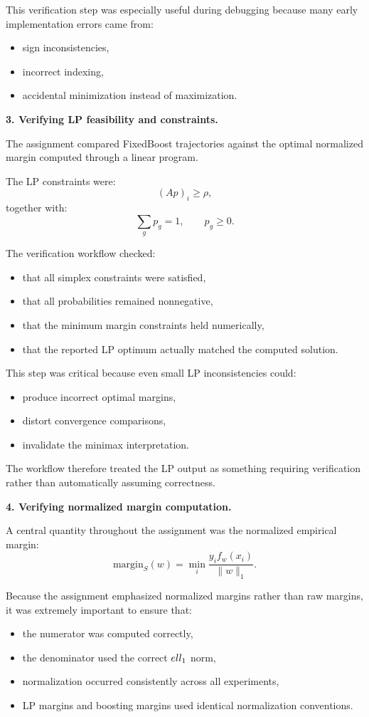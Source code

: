 \documentclass[11pt]{article}
\begin{document}
\begin{enumerate}
\begin{solutionbox}
This verification step was especially useful during debugging because many early implementation errors came from:
\begin{itemize}
    \item sign inconsistencies,
    \item incorrect indexing,
    \item accidental minimization instead of maximization.
\end{itemize}

\medskip

\textbf{3. Verifying LP feasibility and constraints.}

The assignment compared FixedBoost trajectories against the optimal normalized margin computed through a linear program.

The LP constraints were:
\[
(Ap)_i\ge\rho,
\]
together with:
\[
\sum_gp_g=1,
\qquad
p_g\ge0.
\]

The verification workflow checked:
\begin{itemize}
    \item that all simplex constraints were satisfied,
    \item that all probabilities remained nonnegative,
    \item that the minimum margin constraints held numerically,
    \item that the reported LP optimum actually matched the computed solution.
\end{itemize}

This step was critical because even small LP inconsistencies could:
\begin{itemize}
    \item produce incorrect optimal margins,
    \item distort convergence comparisons,
    \item invalidate the minimax interpretation.
\end{itemize}

The workflow therefore treated the LP output as something requiring verification rather than automatically assuming correctness.

\medskip

\textbf{4. Verifying normalized margin computation.}

A central quantity throughout the assignment was the normalized empirical margin:
\[
\mathrm{margin}_S(w)
=
\min_i
\frac{
y_if_w(x_i)
}{
\|w\|_1
}.
\]

Because the assignment emphasized normalized margins rather than raw margins, it was extremely important to ensure that:
\begin{itemize}
    \item the numerator was computed correctly,
    \item the denominator used the correct $\\ell_1$ norm,
    \item normalization occurred consistently across all experiments,
    \item LP margins and boosting margins used identical normalization conventions.
\end{itemize}


\end{solutionbox}
\end{enumerate}
\end{document}
